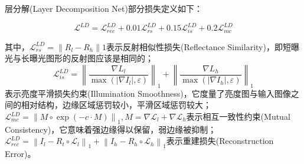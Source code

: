 \documentclass[letterpaper,12pt]{article}
\begin{document}
				层分解(Layer Decomposition Net)部分损失定义如下：
		
			\begin{equation}
				\mathcal{L}^{LD}=\mathcal{L}_{rec}^{LD}+0.01\mathcal{L}_{rs}^{LD}+0.15\mathcal{L}_{is}^{LD}+0.2\mathcal{L}_{mc}^{LD}
			\end{equation}
			
			其中，$\mathcal{L}_{rs}^{LD}=\left\|R_l-R_h\right\|1$表示反射相似性损失(Reflectance Similarity)，即短曝光与长曝光图形的反射图应该是相同的；$$\mathcal{L}_{is}^{LD}=\left\| \frac{\nabla L_{l}}{\max(\left| \nabla I_{l} \right|,\varepsilon)} \right\|_{1} + \left\| {\frac{\nabla L_{h}}{\max (\left| \nabla I_{h} \right| ,\varepsilon)}}\right\|_{1}$$表示亮度平滑损失约束(Illumination Smoothness)，它度量了亮度图与输入图像之间的相对结构，边缘区域惩罚较小，平滑区域惩罚较大；$\mathcal{L}_{mc}^{LD}={\left\|M\circ\exp(-c\cdot M)\right \|}_{1}, M=\nabla \mathcal{L}_{l}+\nabla \mathcal{L}_{h}$表示相互一致性约束(Mutual Consistency)，它意味着强边缘得以保留，弱边缘被抑制；$\mathcal{L}_{rec}^{LD}={\left \| I_l-R_t \circ \mathcal{L}_l\right\|}_{1} + {\left \| I_h-R_h \circ \mathcal{L}_h\right\|}_{1}$表示重建损失(Reconstruction Error)。
		
\end{document}
